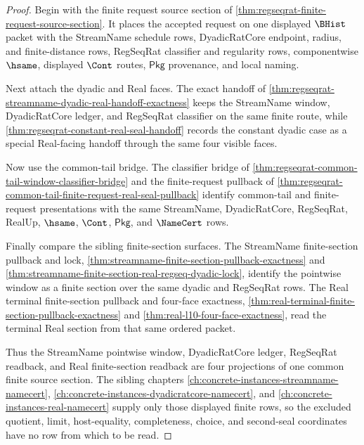 \begin{proof}
Begin with the finite request source section of
\autoref{thm:regseqrat-finite-request-source-section}. It places the accepted
request on one displayed $\BHist$ packet with the StreamName schedule rows,
DyadicRatCore endpoint, radius, and finite-distance rows, RegSeqRat classifier
and regularity rows, componentwise $\hsame$, displayed $\Cont$ routes,
$\mathsf{Pkg}$ provenance, and local naming.

Next attach the dyadic and Real faces. The exact handoff of
\autoref{thm:regseqrat-streamname-dyadic-real-handoff-exactness} keeps the
StreamName window, DyadicRatCore ledger, and RegSeqRat classifier on the same
finite route, while \autoref{thm:regseqrat-constant-real-seal-handoff} records
the constant dyadic case as a special Real-facing handoff through the same four
visible faces.

Now use the common-tail bridge. The classifier bridge of
\autoref{thm:regseqrat-common-tail-window-classifier-bridge} and the
finite-request pullback of
\autoref{thm:regseqrat-common-tail-finite-request-real-seal-pullback} identify
common-tail and finite-request presentations with the same StreamName,
DyadicRatCore, RegSeqRat, RealUp, $\hsame$, $\Cont$, $\mathsf{Pkg}$, and
$\NameCert$ rows.

Finally compare the sibling finite-section surfaces. The StreamName
finite-section pullback and lock,
\autoref{thm:streamname-finite-section-pullback-exactness} and
\autoref{thm:streamname-finite-section-real-regseq-dyadic-lock}, identify the
pointwise window as a finite section over the same dyadic and RegSeqRat rows.
The Real terminal finite-section pullback and four-face exactness,
\autoref{thm:real-terminal-finite-section-pullback-exactness} and
\autoref{thm:real-l10-four-face-exactness}, read the terminal Real section
from that same ordered packet.

Thus the StreamName pointwise window, DyadicRatCore ledger, RegSeqRat
readback, and Real finite-section readback are four projections of one common
finite source section. The sibling chapters
\autoref{ch:concrete-instances-streamname-namecert},
\autoref{ch:concrete-instances-dyadicratcore-namecert}, and
\autoref{ch:concrete-instances-real-namecert} supply only those displayed
finite rows, so the excluded quotient, limit, host-equality, completeness,
choice, and second-seal coordinates have no row from which to be read.
\end{proof}

